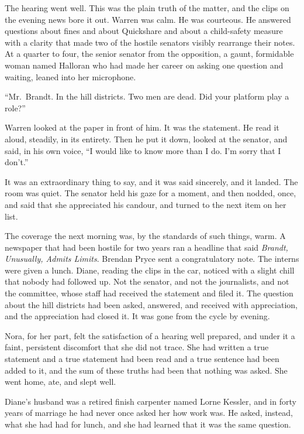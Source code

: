 The hearing went well. This was the plain truth of the matter, and the clips on the evening news bore it out. Warren was calm. He was courteous. He answered questions about fines and about Quickshare and about a child-safety measure with a clarity that made two of the hostile senators visibly rearrange their notes. At a quarter to four, the senior senator from the opposition, a gaunt, formidable woman named Halloran who had made her career on asking one question and waiting, leaned into her microphone.

``Mr.~Brandt. In the hill districts. Two men are dead. Did your platform play a role?''

Warren looked at the paper in front of him. It was the statement. He read it aloud, steadily, in its entirety. Then he put it down, looked at the senator, and said, in his own voice, ``I would like to know more than I do. I'm sorry that I don't.''

It was an extraordinary thing to say, and it was said sincerely, and it landed. The room was quiet. The senator held his gaze for a moment, and then nodded, once, and said that she appreciated his candour, and turned to the next item on her list.

The coverage the next morning was, by the standards of such things, warm. A newspaper that had been hostile for two years ran a headline that said \emph{Brandt, Unusually, Admits Limits}. Brendan Pryce sent a congratulatory note. The interns were given a lunch. Diane, reading the clips in the car, noticed with a slight chill that nobody had followed up. Not the senator, and not the journalists, and not the committee, whose staff had received the statement and filed it. The question about the hill districts had been asked, answered, and received with appreciation, and the appreciation had closed it. It was gone from the cycle by evening.

Nora, for her part, felt the satisfaction of a hearing well prepared, and under it a faint, persistent discomfort that she did not trace. She had written a true statement and a true statement had been read and a true sentence had been added to it, and the sum of these truths had been that nothing was asked. She went home, ate, and slept well.

\scenebreak
\noindent Diane's husband was a retired finish carpenter named Lorne Kessler, and in forty years of marriage he had never once asked her how work was. He asked, instead, what she had had for lunch, and she had learned that it was the same question.


